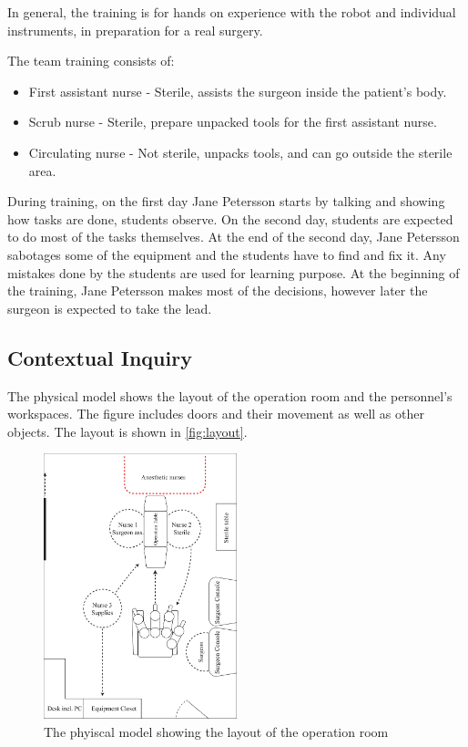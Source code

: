 \documentclass[paper=a4, fontsize=11pt]{scrartcl} %
\numberwithin{equation}{section} %
\numberwithin{figure}{section} %
\numberwithin{table}{section} %
\begin{document}
In general, the training is for hands on experience with the robot and individual instruments, in preparation for a real surgery.

The team training consists of:
\begin{itemize}
  \item First assistant nurse - Sterile, assists the surgeon inside the patient's body.
  \item Scrub nurse - Sterile, prepare unpacked tools for the first assistant nurse.
  \item Circulating nurse - Not sterile, unpacks tools, and can go outside the sterile area.
\end{itemize}  

During training, on the first day Jane Petersson starts by talking and showing how tasks are done, students observe. On the second day, students are expected to do most of the tasks themselves. At the end of the second day, Jane Petersson sabotages some of the equipment and the students have to find and fix it. Any mistakes done by the students are used for learning purpose. At the beginning of the training, Jane Petersson makes most of the decisions, however later the surgeon is expected to take the lead.

\subsection{Contextual Inquiry}
The physical model shows the layout of the operation room and the personnel's workspaces. The figure includes doors and their movement as well as other objects. The layout is shown in \autoref{fig:layout}.

\begin{figure}[hpbt]
	\centering
	\includegraphics[width=0.5\textwidth]{physical}
	\caption{The phyiscal model showing the layout of the operation room}
	\label{fig:layout}
\end{figure}
\end{document}
